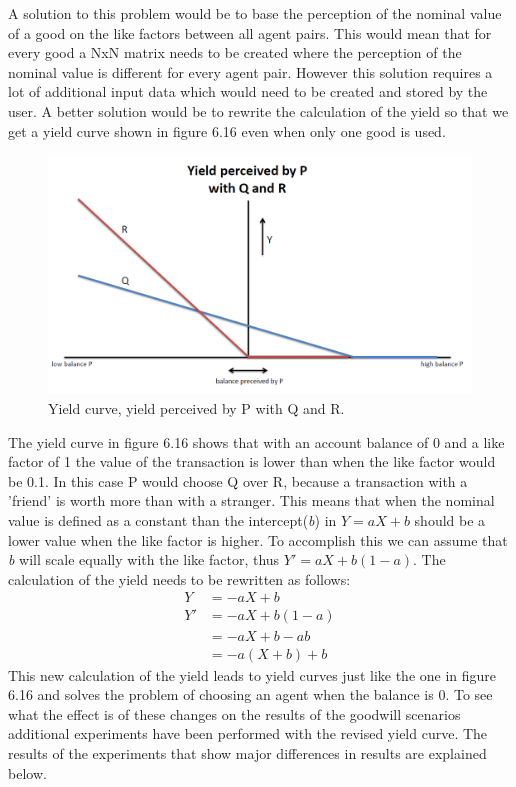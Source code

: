 \documentclass[twoside,openright]{uva-bachelor-thesis}
\begin{document}
A solution to this problem would be to base the perception of the nominal value of a good on the like factors between all agent pairs. This would mean that for every good a NxN matrix needs to be created where the perception of the nominal value is different for every agent pair. However this solution requires a lot of additional input data which would need to be created and stored by the user. A better solution would be to rewrite the calculation of the yield so that we get a yield curve shown in figure 6.16 even when only one good is used. \\
\begin{figure}[h!]
\centering
\includegraphics[scale=0.4]{YieldCurves/yieldcurve_P_QR2}
\caption{Yield curve, yield perceived by P with Q and R.}
\end{figure}

The yield curve in figure 6.16 shows that with an account balance of 0 and a like factor of 1 the value of the transaction is lower than when the like factor would be 0.1. In this case P would choose Q over R, because a transaction with a 'friend' is worth more than with a stranger. This means that when the nominal value is defined as a constant than the intercept(\textit{b}) in \textit{$Y = aX + b$} should be a lower value when the like factor is higher. To accomplish this we can assume that \textit{b} will scale equally with the like factor, thus \textit{$Y' = aX + b(1 - a)$}. The calculation of the yield needs to be rewritten as follows:
\begin{equation}
\begin{split}
Y & = -aX + b \\
Y' & = -aX + b(1 - a) \\
& = -aX + b - ab \\
& = -a(X + b) + b 
\end{split}
\end{equation}
This new calculation of the yield leads to yield curves just like the one in figure 6.16 and solves the problem of choosing an agent when the balance is 0. To see what the effect is of these changes on the results of the goodwill scenarios additional experiments have been performed with the revised yield curve. The results of the experiments that show major differences in results are explained below.
\end{document}
